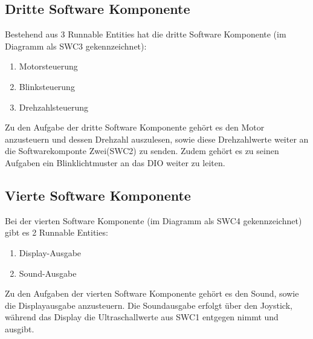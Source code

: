 \documentclass[12pt,a4paper]{article}
\begin{document}
\subsection*{Dritte Software Komponente}
Bestehend aus 3 Runnable Entities hat die dritte Software Komponente (im Diagramm als SWC3 gekennzeichnet):
\begin{enumerate}
\item Motorsteuerung
\item Blinksteuerung
\item Drehzahlsteuerung
\end{enumerate}
Zu den Aufgabe der dritte Software Komponente gehört es den Motor anzusteuern und dessen Drehzahl auszulesen, sowie diese Drehzahlwerte weiter an die Softwarekomponte Zwei(SWC2) zu senden. Zudem gehört es zu seinen Aufgaben ein Blinklichtmuster an das DIO weiter zu leiten.

\subsection*{Vierte Software Komponente}
Bei der vierten Software Komponente (im Diagramm als SWC4 gekennzeichnet) gibt es 2 Runnable Entities:
\begin{enumerate}
\item Display-Ausgabe
\item Sound-Ausgabe
\end{enumerate}
Zu den Aufgaben der vierten Software Komponente gehört es den Sound, sowie die Displayausgabe anzusteuern. Die Soundausgabe erfolgt über den Joystick, während das Display die Ultraschallwerte aus SWC1 entgegen nimmt und ausgibt.
\end{document}
